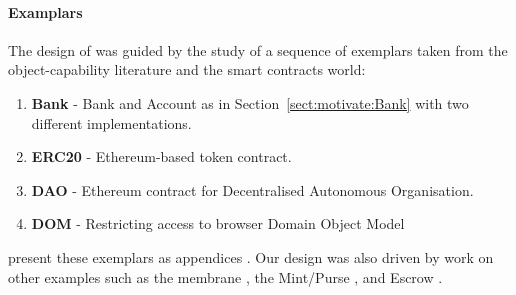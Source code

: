 

\paragraph{Examplars}

The design of \Chainmail was guided by the study of a sequence of
exemplars taken from the object-capability literature and the smart
contracts world:

\begin{enumerate}
\item \textbf{Bank} \cite{arnd18} - Bank and Account as in
Section~\ref{sect:motivate:Bank} with two different implementations.
\item
\textbf{ERC20} \cite{ERC20} - Ethereum-based token contract.
\item
\textbf{DAO} \cite{Dao,DaoBug} - Ethereum contract for Decentralised Autonomous
Organisation.
\item
\textbf{DOM} \cite{dd,ddd} - Restricting access to browser Domain Object Model\\
\end{enumerate}

\noindent
{} present these exemplars as 
appendices \cite{examples}. Our design was also driven by work on other
examples such as the membrane \cite{membranesJavascript},
the Mint/Purse \cite{MillerPhD}, and %
Escrow \cite{proxiesECOOP2013,swapsies}.


